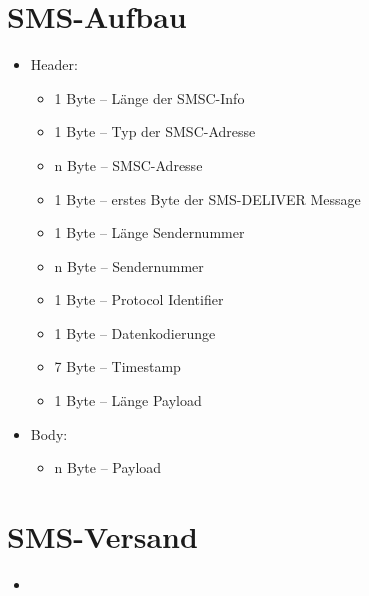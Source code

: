 \documentclass[german,11pt,a4paper]{article}
\begin{document}
\section{SMS-Aufbau}
\begin{itemize}
	\item Header:
		\begin{itemize}
			\item 1 Byte -- Länge der SMSC-Info
			\item 1 Byte -- Typ der SMSC-Adresse
			\item n Byte -- SMSC-Adresse
			\item 1 Byte -- erstes Byte der SMS-DELIVER Message
			\item 1 Byte -- Länge Sendernummer 
			\item n Byte -- Sendernummer
			\item 1 Byte -- Protocol Identifier
			\item 1 Byte -- Datenkodierunge
			\item 7 Byte -- Timestamp
			\item 1 Byte -- Länge Payload
		\end{itemize}
	\item Body:
		\begin{itemize}
			\item n Byte -- Payload
		\end{itemize}	
\end{itemize}

\section{SMS-Versand}
\begin{itemize}
	\item 
\end{itemize}
\end{document}
